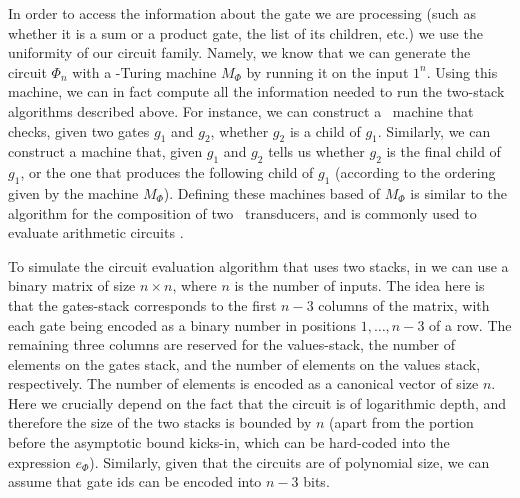 In order  to access the information about the gate we are processing (such as whether it is a sum or a product gate, the list of its children, etc.) we use the uniformity of our circuit family. Namely, we know that we can generate the circuit $\Phi_n$ with a \logspace-Turing machine $M_\Phi$ by running it on the input $1^n$. Using this machine, we can in fact compute all the information needed to run the two-stack algorithms described above. For instance, we can construct a \logspace\ machine that checks, given two gates $g_1$ and $g_2$, whether $g_2$ is a child of $g_1$. Similarly, we can construct a machine that, given $g_1$ and $g_2$ tells us whether $g_2$ is the final child of $g_1$, or the one that produces the following child of $g_1$ (according to the ordering given by the machine $M_\Phi$). Defining these machines based of $M_\Phi$ is similar to the algorithm for the composition of two \logspace\ transducers, and is commonly used to evaluate arithmetic circuits \citep{allender}. %


To simulate the circuit evaluation algorithm that uses two stacks, in \langfor we can use a binary matrix of size $n\times n$, where $n$ is the number of inputs. The idea here is that  the gates-stack corresponds to the first $n-3$ columns of the matrix, with each gate being encoded as a binary number in positions $1,\ldots,n-3$ of a row. The remaining three columns are reserved for the values-stack, the number of elements on the gates stack, and the number of elements on the values stack, respectively. The number of elements is encoded as a canonical vector of size $n$. Here we crucially depend on the fact that the circuit is of logarithmic depth, and therefore the size of the two stacks is bounded by $n$ (apart from the portion before the asymptotic bound kicks-in, which can be hard-coded into the expression $e_\Phi$). Similarly, given that the circuits are of polynomial size, we can assume that gate ids can be encoded into $n-3$ bits.

